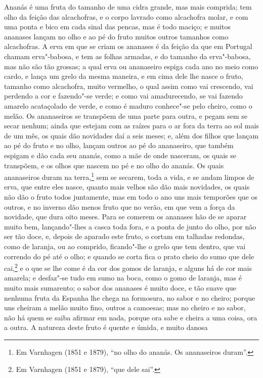 \begin{linenumbers}
Ananás é uma fruta do tamanho de uma cidra grande, mas mais comprida; tem olho da feição
das alcachofras, e o corpo lavrado como alcachofra molar, e com uma ponta e bico em cada
sinal das pencas, mas é todo maciço; e muitos ananases lançam no olho e ao pé do fruto
muitos outros tamanhos como alcachofras. A erva em que se criam os ananases é da feição da
que em Portugal chamam erva"-babosa, e tem as folhas armadas, e do tamanho da erva"-babosa,
mas não são tão grossas; a qual erva ou ananaseiro espiga cada ano no meio como cardo, e
lança um grelo da mesma maneira, e em cima dele lhe nasce o fruto, tamanho como
alcachofra, muito vermelho, o qual assim como vai crescendo, vai perdendo a cor e
fazendo"-se verde; e como vai amadurecendo, se vai fazendo amarelo acataçolado de verde, e
como é maduro conhece"-se pelo cheiro, como o melão. Os ananaseiros se transpõem de uma
parte para outra, e pegam sem se secar nenhum; ainda que estejam com as raízes para o ar
fora da terra ao sol mais de um mês, os quais dão novidades daí a seis meses; e, além dos
filhos que lançam ao pé do fruto e no olho, lançam outros ao pé do ananaseiro, que também
espigam e dão cada seu ananás, como a mãe de onde nasceram, os quais se transpõem, e os
olhos que nascem no pé e no olho do ananás. Os quais ananaseiros duram na terra,\footnote{
Em Varnhagen (1851 e 1879), ``no olho do ananás. Os ananaseiros duram''.} sem se secarem,
toda a vida, e se andam limpos de erva, que entre eles nasce, quanto mais velhos são dão
mais novidades, os quais não dão o fruto todos juntamente, mas em todo o ano uns mais
temporões que os outros, e no inverno dão menos fruto que no verão, em que vem a força da
novidade, que dura oito meses. Para se comerem os ananases hão de se aparar muito bem,
lançando"-lhes a casca toda fora, e a ponta de junto do olho, por não ser tão doce, e,
depois de aparado este fruto, o cortam em talhadas redondas, como de laranja, ou ao
comprido, ficando"-lhe o grelo que tem dentro, que vai correndo do pé até o olho; e quando
se corta fica o prato cheio do sumo que dele cai,\footnote{ Em Varnhagen (1851 e 1879),
``que dele sai''.} e o que se lhe come é da cor dos gomos de laranja, e alguns há de cor
mais amarela; e desfaz"-se tudo em sumo na boca, como o gomo de laranja, mas é muito mais
sumarento; o sabor dos ananases é muito doce, e tão suave que nenhuma fruta da Espanha lhe
chega na formosura, no sabor e no cheiro; porque uns cheiram a melão muito fino, outros a
camoesas; mas no cheiro e no sabor, não há quem se saiba afirmar em nada, porque ora sabe
e cheira a uma coisa, ora a outra. A natureza deste fruto é quente e úmida, e muito danosa

\end{linenumbers}
